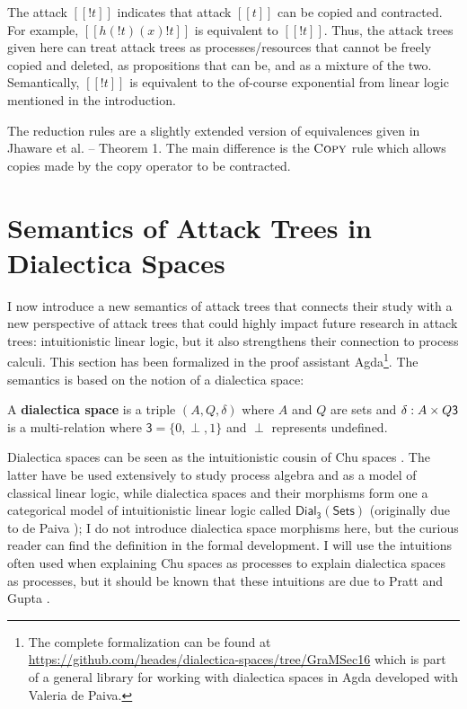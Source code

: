 \documentclass{llncs}
\let\to\relax
\newcommand{\to}{\rightarrow}
\newcommand{\dial}[0]{\mathsf{Dial_3}(\mathsf{Sets})}
\begin{document}
The attack $[[! t]]$ indicates that attack $[[t]]$ can be copied and
contracted.  For example, $[[h(!t) (x) !t]]$ is equivalent to $[[!
    t]]$.  Thus, the attack trees given here can treat attack trees as
processes/resources that cannot be freely copied and deleted, as
propositions that can be, and as a mixture of the two.  Semantically,
$[[! t]]$ is equivalent to the of-course exponential from linear logic
mentioned in the introduction.

The reduction rules are a slightly extended version of equivalences
given in Jhaware et al. \cite{Jhawar:2015} -- Theorem 1.  The main
difference is the $\textsc{Copy}$ rule which allows copies made by the
copy operator to be contracted.

\section{Semantics of Attack Trees in Dialectica Spaces}
\label{sec:concrete_semantics_of_attack_trees_in_dialectica_spaces}

I now introduce a new semantics of attack trees that connects their
study with a new perspective of attack trees that could highly impact
future research in attack trees: intuitionistic linear logic, but it
also strengthens their connection to process calculi.  This section
has been formalized in the proof assistant Agda\footnote{The complete
  formalization can be found at
  \url{https://github.com/heades/dialectica-spaces/tree/GraMSec16}
  which is part of a general library for working with dialectica
  spaces in Agda developed with Valeria de Paiva.}.  The semantics is
based on the notion of a dialectica space:

\begin{definition}
  \label{def:dialectica-space}
  A \textbf{dialectica space} is a triple $(A, Q, \delta)$ where $A$
  and $Q$ are sets and $\delta : A \times Q \to \mathsf{3}$ is a
  multi-relation where $\mathsf{3} = \{0,\perp,1\}$ and $\perp$
  represents undefined.
\end{definition}

Dialectica spaces can be seen as the intuitionistic cousin
\cite{dePaiva:2006b} of Chu spaces \cite{Pratt:1999}.  The latter have
be used extensively to study process algebra and as a model of
classical linear logic, while dialectica spaces and their morphisms
form one a categorical model of intuitionistic linear logic called
$\dial$ (originally due to de Paiva \cite{dePaiva:1987}); I do not
introduce dialectica space morphisms here, but the curious reader can
find the definition in the formal development. I will use the
intuitions often used when explaining Chu spaces as processes to
explain dialectica spaces as processes, but it should be known that
these intuitions are due to Pratt and Gupta \cite{Gupta:1994}.
\end{document}
